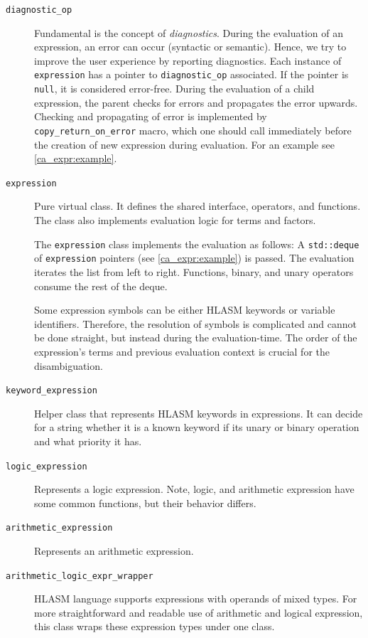 \begin{description}
	\item[\texttt{diagnostic\_op}] Fundamental is the concept of \emph{diagnostics}. During the evaluation of an expression, an error can occur (syntactic or semantic). Hence, we try to improve the user experience by reporting diagnostics. Each instance of \texttt{expression} has a pointer to \texttt{diagnostic\_op} associated. If the pointer is \texttt{null}, it is considered error-free. During the evaluation of a child expression, the parent checks for errors and propagates the error upwards. Checking and propagating of error is implemented by \texttt{copy\_return\_on\_error} macro, which one should call immediately before the creation of new expression during evaluation. For an example see \cref{ca_expr:example}. 
	
	\item[\texttt{expression}] Pure virtual class. It defines the shared interface, operators, and functions. The class also implements evaluation logic for terms and factors. 
	
	The \texttt{expression} class implements the evaluation as follows:
	A \texttt{std::deque} of \texttt{expression} pointers (see  \cref{ca_expr:example}) is passed. The evaluation iterates the list from left to right.  Functions, binary, and unary operators consume the rest of the deque.
	
	Some expression symbols can be either HLASM keywords or variable identifiers. Therefore, the resolution of symbols is complicated and cannot be done straight, but instead during the evaluation-time. The order of the expression's terms and previous evaluation context is crucial for the disambiguation. 
	
	\item[\texttt{keyword\_expression}] Helper class that represents HLASM keywords in expressions. It can decide for a string whether it is a known keyword if its unary or binary operation and what priority it has.
	
	\item[\texttt{logic\_expression}] Represents a logic expression. Note, logic, and arithmetic expression have some common functions, but their behavior differs. 
	
	\item[\texttt{arithmetic\_expression}] Represents an arithmetic expression.
	
	\item[\texttt{arithmetic\_logic\_expr\_wrapper}] HLASM language supports expressions with operands of mixed types. For more straightforward and readable use of arithmetic and logical expression, this class wraps these expression types under one class.
	

\end{description}
